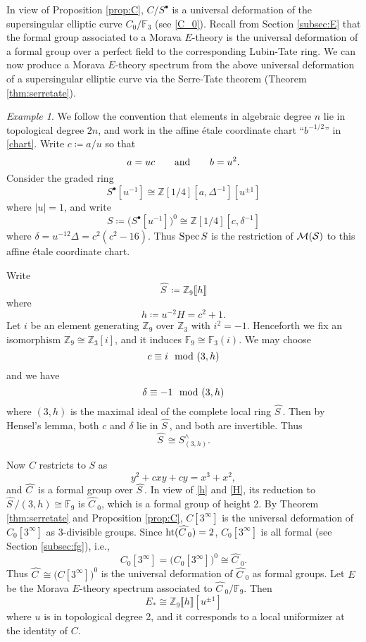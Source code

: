 \documentclass{gtpart}
\theoremstyle{definition}
\theoremstyle{remark}
\newtheorem{ex}[thm]{Example}
\newcommand{\mb}[1]{\mathbb{#1}}
\newcommand{\Spec}{{\rm Spec\thinspace}}
\newcommand{\CM}{{\cal M}}
\newcommand{\CS}{{\cal S}}
\newcommand{\BF}{{\mb F}}
\newcommand{\BZ}{{\mb Z}}
\newcommand{\HC}{\widehat{C~}\!}
\newcommand{\HS}{\widehat{S~}\!}
\newcommand{\md}{~~{\rm mod}~}
\newcommand{\ad}{{\rm and}}
\newcommand{\HT}{{\rm ht}}
\newcommand{\s}{S^\bullet}
\newcommand{\ce}{\coloneqq}
\numberwithin{equation}{section}
\numberwithin{thm}{section}
\begin{document}
In view of Proposition \ref{prop:C}, $C/\s$ is a universal deformation 
of the supersingular elliptic curve $C_0/\BF_3$ (see \eqref{C_0}).  
Recall from Section \ref{subsec:E} that the formal group associated to a 
Morava $E$-theory is the universal deformation of a formal group over a 
perfect field to the corresponding Lubin-Tate ring.  We can now produce 
a Morava $E$-theory spectrum from the above universal deformation of a 
supersingular elliptic curve via the Serre-Tate theorem (Theorem 
\ref{thm:serretate}).  

\begin{ex}
\label{ex:E}
 We follow the convention that elements in algebraic degree $n$ lie in 
 topological degree $2n$, and work in the affine \'etale coordinate 
 chart ``$b^{-1/2}$'' in \eqref{chart}.  Write $c \ce a/u$ so that 
 \[
  a = u c \qquad \ad \qquad b = u^2.  
 \]
 Consider the graded ring 
 \[
  \s[u^{-1}] \cong \BZ [1/4] [a, \Delta^{-1}] [u^{\pm1}] 
 \]
 where $|u| = 1$, and write 
 \[
  S \ce \big( \s[u^{-1}] \big)^0 \cong \BZ [1/4] [c, \delta^{-1}] 
 \]
 where $\delta = u^{-12} \Delta = c^2 (c^2 - 16)$.  Thus $\Spec S$ is 
 the restriction of $\CM(\CS)$ to this affine \'etale coordinate chart.  

 Write 
 \[
  \HS \ce \BZ_9 \llbracket h \rrbracket 
 \]
 where 
 \begin{equation}
 \label{h}
  h \ce u^{-2} H = c^2 + 1.  
 \end{equation}
 Let $i$ be an element generating $\BZ_9$ over $\BZ_3$ with $i^2 = -1$.  
 Henceforth we fix an isomorphism $\BZ_9 \cong \BZ_3[i]$, and it induces 
 $\BF_9 \cong \BF_3(i)$.  We may choose 
 \[
  c \equiv i \md (3,h) 
 \]
 and we have 
 \[
  \delta \equiv -1 \md (3,h) 
 \]
 where $(3,h)$ is the maximal ideal of the complete local ring $\HS$.  
 Then by Hensel's lemma, both $c$ and $\delta$ lie in $\HS$, and both 
 are invertible.  Thus 
 \[
  \HS \cong S_{(3,h)}^\wedge.  
 \]

 Now $C$ restricts to $S$ as 
 \begin{equation}
 \label{Cc}
  y^2 + c x y + c y = x^3 + x^2, 
 \end{equation}
 and $\HC$ is a formal group over $\HS$.  In view of \eqref{h} and 
 \eqref{H}, its reduction to $\HS / (3,h) \cong \BF_9$ is $\HC_0$, which 
 is a formal group of height 2.  By Theorem \ref{thm:serretate} and 
 Proposition \ref{prop:C}, $C[3^\infty]$ is the universal deformation of 
 $C_0[3^\infty]$ as 3-divisible groups.  Since $\HT(\HC_0) = 2$, 
 $C_0[3^\infty]$ is all formal (see Section \ref{subsec:fg}), i.e., 
 \[
  C_0[3^\infty] = \big( C_0[3^\infty] \big)^0 \cong \HC_0.  
 \]
 Thus $\HC \cong \big( C[3^\infty] \big)^0$ is the universal deformation 
 of $\HC_0$ as formal groups.  Let $E$ be the Morava $E$-theory spectrum 
 associated to $\HC_0/\BF_9$.  Then 
 \[
  E_* \cong \BZ_9 \llbracket h \rrbracket [u^{\pm 1}] 
 \]
 where $u$ is in topological degree 2, and it corresponds to a local 
 uniformizer at the identity of $C$.  
\end{ex}
\end{document}
